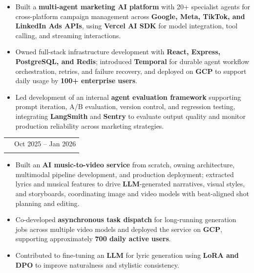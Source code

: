 \documentclass[a4paper,10pt]{article}
\makeatletter
\newcommand{\DetailFont}{\fontsize{9.5}{11.5}\selectfont}
\newlength{\EntryGap}
\newlength{\BulletGap}
\newlength{\HeadingToBullets}
\newenvironment{resumeBullets}{%
  \begin{itemize}[
    leftmargin=12pt,
    labelsep=5pt,
    label=\textbullet,
    itemsep=\BulletGap,
    parsep=0pt,
    topsep=\HeadingToBullets,
    partopsep=0pt
  ]
}{%
  \end{itemize}
}
\newcommand{\entry}[3]{%
  \Needspace{7\baselineskip}%
  \begin{tabularx}{\linewidth}{
    @{}
    >{\raggedright\arraybackslash}X
    @{\hspace{12pt}}
    r
    @{}
  }
    {\fontsize{11}{13}\selectfont\bfseries #1}
      & {\DetailFont #2}\\[2pt]
    \multicolumn{2}{@{}p{\linewidth}@{}}{
      {\fontsize{10}{12}\selectfont\itshape #3}
    }\\
  \end{tabularx}\par\nobreak
}
\makeatother
\begin{document}
\begin{resumeBullets}
  \item Built a \textbf{multi-agent marketing AI platform} with 20+ specialist agents for cross-platform campaign management across \textbf{Google, Meta, TikTok, and LinkedIn Ads APIs}, using \textbf{Vercel AI SDK} for model integration, tool calling, and streaming interactions.

  \item Owned full-stack infrastructure development with \textbf{React, Express, PostgreSQL, and Redis}; introduced \textbf{Temporal} for durable agent workflow orchestration, retries, and failure recovery, and deployed on \textbf{GCP} to support daily usage by \textbf{100+ enterprise users}.

  \item Led development of an internal \textbf{agent evaluation framework} supporting prompt iteration, A/B evaluation, version control, and regression testing, integrating \textbf{LangSmith} and \textbf{Sentry} to evaluate output quality and monitor production reliability across marketing strategies.
\end{resumeBullets}

\vspace{\EntryGap}

\entry
  {Mozart AI (London / Paris)}
  {Oct 2025 -- Jan 2026}
  {AI Engineer $|$ Backed by EWOR}

\begin{resumeBullets}
  \item Built an \textbf{AI music-to-video service} from scratch, owning architecture, multimodal pipeline development, and production deployment; extracted lyrics and musical features to drive \textbf{LLM}-generated narratives, visual styles, and storyboards, coordinating image and video models with beat-aligned shot planning and editing.

  \item Co-developed \textbf{asynchronous task dispatch} for long-running generation jobs across multiple video models and deployed the service on \textbf{GCP}, supporting approximately \textbf{700 daily active users}.

  \item Contributed to fine-tuning an \textbf{LLM} for lyric generation using \textbf{LoRA and DPO} to improve naturalness and stylistic consistency.
\end{resumeBullets}

\vspace{\EntryGap}
\end{document}
